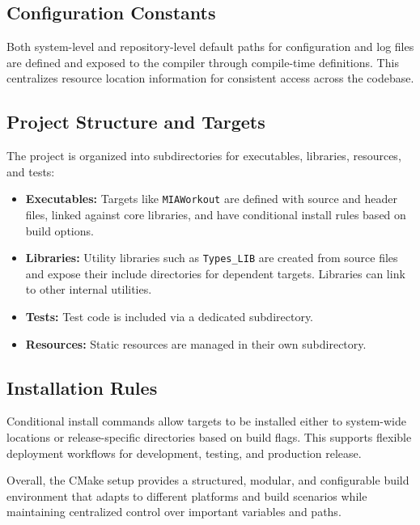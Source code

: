 \subsection{Configuration Constants}

Both system-level and repository-level default paths for configuration and log files are defined and exposed to the compiler through compile-time definitions. This centralizes resource location information for consistent access across the codebase.

\subsection{Project Structure and Targets}

The project is organized into subdirectories for executables, libraries, resources, and tests:

\begin{itemize}
	\item \textbf{Executables:} Targets like \texttt{MIAWorkout} are defined with source and header files, linked against core libraries, and have conditional install rules based on build options.
	\item \textbf{Libraries:} Utility libraries such as \texttt{Types\_LIB} are created from source files and expose their include directories for dependent targets. Libraries can link to other internal utilities.
	\item \textbf{Tests:} Test code is included via a dedicated subdirectory.
	\item \textbf{Resources:} Static resources are managed in their own subdirectory.
\end{itemize}

\subsection{Installation Rules}

Conditional install commands allow targets to be installed either to system-wide locations or release-specific directories based on build flags. This supports flexible deployment workflows for development, testing, and production release.

Overall, the CMake setup provides a structured, modular, and configurable build environment that adapts to different platforms and build scenarios while maintaining centralized control over important variables and paths.


















